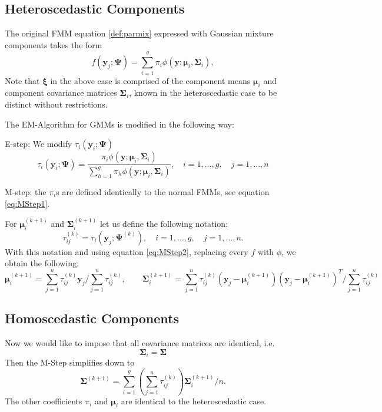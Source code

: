\documentclass{article}\usepackage[]{graphicx}\usepackage[]{xcolor}
\theoremstyle{plain}
\theoremstyle{definition}
\theoremstyle{remark}
\newcommand{\boldy}{\mathbf{y}}
\newcommand{\boldPsi}{\boldsymbol{\Psi}}
\newcommand{\boldxi}{\boldsymbol{\xi}}
\newcommand{\boldmu}{\boldsymbol{\mu}}
\newcommand{\boldSigma}{\boldsymbol{\Sigma}}
\begin{document}
\subsection{Heteroscedastic Components}

The original FMM equation \eqref{def:parmix} expressed with Gaussian mixture components takes the form
\begin{equation} \label{def:GMM} 
  f(\boldy_j; \boldPsi) = \sum_{i=1}^g \pi_i \phi (\boldy ; \boldmu_i, \boldSigma_i),
\end{equation}
Note that $\boldxi$ in the above case is comprised of the component means $\boldmu_i$ and component covariance matrices $\boldSigma_i$, known in the heteroscedastic case to be distinct without restrictions.

The EM-Algorithm for GMMs is modified in the following way:

E-step: We modify $\tau_i (\boldy_i ; \boldPsi)$
\begin{equation}\label{eq:EStepGMM}
   \tau_i (\boldy_i ; \boldPsi) = \frac{\pi_i \phi (\boldy ; \boldmu_i, \boldSigma_i)}{\sum_{h=1}^g \pi_h \phi (\boldy ; \boldmu_i, \boldSigma_i)}, \quad i = 1, \dots, g, \quad  j = 1, \dots, n
\end{equation}

M-step: the $\pi_i$s are defined identically to the normal FMMs, see equation \eqref{eq:MStep1}.

For $\boldmu_i^{(k+1)}$ and $\boldSigma_i^{(k+1)}$ let us define the following notation:
\begin{equation} \label{eq:tauGMM}
  \tau_{ij}^{(k)} = \tau_i(\boldy_j; \boldPsi^{(k)}), \quad i = 1, \dots, g, \quad  j = 1, \dots, n.
\end{equation}
With this notation and using equation \eqref{eq:MStep2}, replacing every $f$ with $\phi$, we obtain the following:
\begin{equation} \label{eq:Mstep2GMM}
  \boldmu_i^{(k+1)} = \sum_{j=1}^n \tau_{ij}^{(k)} \boldy_j / \sum_{j=1}^n \tau_{ij}^{(k)}, \quad \quad \boldSigma_i^{(k+1)} = \sum_{j=1}^n \tau_{ij}^{(k)} (\boldy_j - \boldmu_i^{(k+1)}) (\boldy_j - \boldmu_i^{(k+1)})^T / \sum_{j=1}^n \tau_{ij}^{(k)}
\end{equation}

\subsection{Homoscedastic Components}
Now we would like to impose that all covariance matrices are identical, i.e.
\begin{equation*}
  \boldSigma_i = \boldSigma
\end{equation*}
Then the M-Step simplifies down to
\begin{equation}\label{eq:MStepHomo}
  \boldSigma^{(k+1)} = \sum_{i=1}^g \left( \sum_{j=1}^n \tau_{ij}^{(k)} \right) \boldSigma_i^{(k+1)}/n.
\end{equation}
The other coefficients $\pi_i$ and $\boldmu_i$ are identical to the heteroscedastic case.
\end{document}

